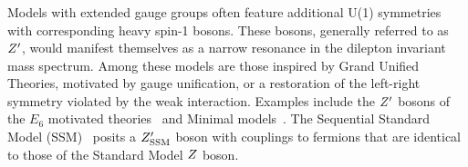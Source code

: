 \subsubsection{}
\label{subsubsec:hr_lep}

\newcommand*{\sqrtshelhc}{\ensuremath{\sqrt{s}=\text{27 TeV}}}






Models with extended gauge groups often feature additional U(1) symmetries with corresponding heavy spin-1 bosons. These bosons, generally referred to as $Z^{\prime}$, would manifest themselves as a narrow resonance in the dilepton invariant mass spectrum. Among these models are those inspired by Grand Unified Theories, motivated by gauge unification, or a restoration of the left-right symmetry violated by the weak interaction. Examples include the $Z^{\prime}$ bosons of the $E_{6}$ motivated theories~\cite{London:1986jz,Joglekar:2016yap,Langacker:2008yv} and Minimal models~\cite{Salvioni:2009mt}. The Sequential Standard Model (SSM)~\cite{Langacker:2008yv} posits a $Z^{\prime}_{\mathrm{SSM}}$ boson with couplings to fermions that are identical to those of the Standard Model $Z$ boson.

